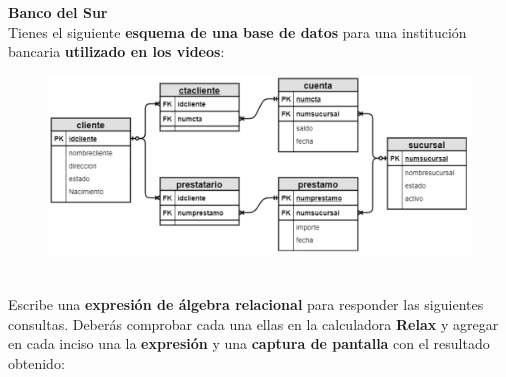\documentclass{exam}
\begin{document}
\begin{questions}
	\newpage
	\question \textbf{Banco del Sur}\\
	Tienes el siguiente \textbf{esquema de una base de datos} para una institución bancaria \textbf{utilizado en los videos}:\\
	\begin{figure}[h!]
		\includegraphics[width=15cm]{imgs/2.png}
		\centering
	\end{figure}	\\
	Escribe una \textbf{expresión de álgebra relacional} para responder las siguientes consultas. Deberás comprobar cada una ellas
en la calculadora \textbf{Relax} y agregar en cada inciso una la \textbf{expresión} y una \textbf{captura de pantalla} con el resultado obtenido:
	

\end{questions}
\end{document}
